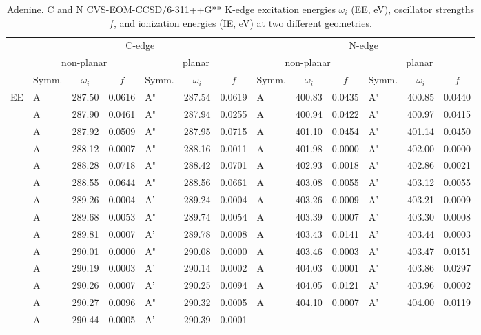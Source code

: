\documentclass[journal=jctcce,manuscript=article]{achemso}
\begin{document}
\begin{table}
\caption{Adenine.  C and N CVS-EOM-CCSD/6-311++G** K-edge excitation energies $\omega_i$ (EE, eV), oscillator strengths $f$, and ionization energies (IE, eV) at two different geometries.
\label{Tab:Adenine}}
\scriptsize
\begin{tabular}{l|lcc|lcc||lcc|lcc}
\cline{2-13}
& \multicolumn{6}{c||}{C-edge}
& \multicolumn{6}{c}{N-edge}\\\cline{2-7}\cline{8-13}
& \multicolumn{3}{c|}{non-planar}
& \multicolumn{3}{c||}{planar}  
& \multicolumn{3}{c|}{non-planar}
& \multicolumn{3}{c}{planar} \\
\cline{2-13}
& Symm. & $\omega_i$ & $f$ 
& Symm. & $\omega_i$ & $f$ 
& Symm. & $\omega_i$ & $f$ 
& Symm. & $\omega_i$ & $f$\\
\hline
  EE 
& A & 287.50 & 0.0616	& A" & 287.54 & 0.0619   
& A & 400.83 & 0.0435	& A" & 400.85 & 0.0440 \\
& A & 287.90 & 0.0461	& A" & 287.94 & 0.0255 
& A & 400.94 & 0.0422	& A" & 400.97 & 0.0415 \\
& A & 287.92 & 0.0509	& A" & 287.95 & 0.0715  
& A & 401.10 & 0.0454	& A" & 401.14 & 0.0450 \\
& A & 288.12 & 0.0007	& A" & 288.16 & 0.0011  
& A & 401.98 & 0.0000	& A" & 402.00 & 0.0000 \\
& A & 288.28 & 0.0718	& A" & 288.42 & 0.0701 
& A & 402.93 & 0.0018	& A" & 402.86 & 0.0021 \\
& A & 288.55 & 0.0644	& A" & 288.56 & 0.0661  
& A & 403.08 & 0.0055	& A' & 403.12 & 0.0055 \\
& A & 289.26 & 0.0004	& A' & 289.24 & 0.0004  
& A & 403.26 & 0.0009	& A' & 403.21 & 0.0009 \\
& A & 289.68 & 0.0053	& A" & 289.74 & 0.0054  
& A & 403.39 & 0.0007	& A' & 403.30 & 0.0008 \\
& A & 289.81 & 0.0007	& A' & 289.78 & 0.0008  
& A & 403.43 & 0.0141	& A' & 403.44 & 0.0003 \\
& A & 290.01 & 0.0000	& A" & 290.08 & 0.0000  
& A & 403.46 & 0.0003	& A" & 403.47 & 0.0151 \\
& A & 290.19 & 0.0003	& A' & 290.14 & 0.0002  
& A & 404.03 & 0.0001	& A" & 403.86 & 0.0297 \\
& A & 290.26 & 0.0007	& A' & 290.25 & 0.0094  
& A & 404.05 & 0.0121	& A' & 403.96 & 0.0002 \\
& A & 290.27 & 0.0096	& A" & 290.32 & 0.0005  
& A & 404.10 & 0.0007	& A' & 404.00 & 0.0119 \\
& A & 290.44 & 0.0005	& A' & 290.39 & 0.0001  

\end{tabular}
\end{table}
\end{document}
